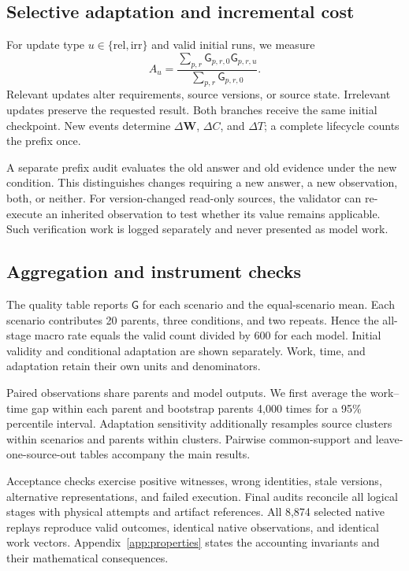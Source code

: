 \documentclass[11pt]{article}
\newcommand{\G}{\mathsf{G}}
\newcommand{\W}{\mathbf{W}}
\begin{document}
\subsection{Selective adaptation and incremental cost}
For update type $u\in\{\mathrm{rel},\mathrm{irr}\}$ and valid initial runs, we measure
\begin{equation}
A_u=\frac{\sum_{p,r}\G_{p,r,0}\G_{p,r,u}}
{\sum_{p,r}\G_{p,r,0}}.
\label{eq:adapt}
\end{equation}
Relevant updates alter requirements, source versions, or source state. Irrelevant updates preserve the requested result. Both branches receive the same initial checkpoint. New events determine $\Delta\W$, $\Delta C$, and $\Delta T$; a complete lifecycle counts the prefix once.

A separate prefix audit evaluates the old answer and old evidence under the new condition. This distinguishes changes requiring a new answer, a new observation, both, or neither. For version-changed read-only sources, the validator can re-execute an inherited observation to test whether its value remains applicable. Such verification work is logged separately and never presented as model work.

\subsection{Aggregation and instrument checks}
The quality table reports $\G$ for each scenario and the equal-scenario mean. Each scenario contributes 20 parents, three conditions, and two repeats. Hence the all-stage macro rate equals the valid count divided by 600 for each model. Initial validity and conditional adaptation are shown separately. Work, time, and adaptation retain their own units and denominators.

Paired observations share parents and model outputs. We first average the work--time gap within each parent and bootstrap parents 4,000 times for a 95\% percentile interval. Adaptation sensitivity additionally resamples source clusters within scenarios and parents within clusters. Pairwise common-support and leave-one-source-out tables accompany the main results.

Acceptance checks exercise positive witnesses, wrong identities, stale versions, alternative representations, and failed execution. Final audits reconcile all logical stages with physical attempts and artifact references. All 8,874 selected native replays reproduce valid outcomes, identical native observations, and identical work vectors. Appendix~\ref{app:properties} states the accounting invariants and their mathematical consequences.
\end{document}
